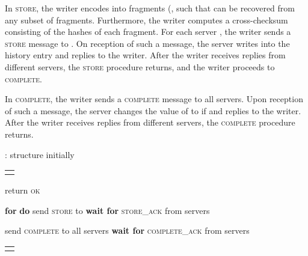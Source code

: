 \documentclass[10pt,conference,compsocconf]{IEEEtran}
\newcommand{\protocol}{PoWerStore}
\newcommand{\complete}{\textsc{complete}}
\begin{document}
In \textsc{store}, the writer encodes  into  fragments  (, such that  can be recovered from any subset of  fragments. Furthermore, the writer computes a cross-checksum  consisting of the hashes of each fragment. For each server  , the writer sends a \textsc{store} message to . On reception of such a message, the server writes  into the history entry  and replies to the writer.
After the writer receives  replies from different servers, the \textsc{store} procedure returns, and the writer proceeds to \textsc{\complete}.

In \textsc{\complete}, the writer sends a \textsc{\complete} message to all servers. Upon reception of such a message, the server changes the value of  to  if  and replies to the writer. After the writer receives  replies from different servers, the \textsc{\complete} procedure returns.


\begin{algo}[t]
\small
{}

\begin{distribalgo}[1] \setcounter{ALC@line}{\value{alg:client1:lines}}
\smallskip
{}
\STATE  : structure  initially 
\ENDINDENT

\setcounter{alg:client1:lines}{\value{ALC@line}}
\end{distribalgo}

\begin{tabular}{c}\hline\mbox{}\hspace{0.45\textwidth}\mbox{}\end{tabular}
\vspace{-2 em}
\begin{distribalgo}[1]  \setcounter{ALC@line}{\value{alg:client1:lines}}
\STATE  \label{alg:writer:timestamp}
\STATE 
\STATE 
\STATE  \label{alg:writer:store}
\STATE  \label{alg:writer:complete}
\STATE return \textsc{ok}
\ENDINDENT

\medskip
{}
\STATE 
\STATE 
\STATE \textbf{for}  \textbf{do} send \textsc{store} to 
\STATE \textbf{wait for} \textsc{store\_ack} from  servers
\ENDINDENT

\medskip
\INDENT {\textbf{procedure} \textsc{\complete}()}
\STATE send \textsc{\complete} to all servers
\STATE \textbf{wait for} \textsc{\complete\_ack} from  servers
\ENDINDENT

\setcounter{alg:client1:lines}{\value{ALC@line}}

\end{distribalgo}

\begin{tabular}{c}\hline\mbox{}\hspace{0.45\textwidth}\mbox{}\end{tabular}

\caption{{Algorithm of the writer in \protocol.}}\label{alg:writer}
\end{algo}
\end{document}
